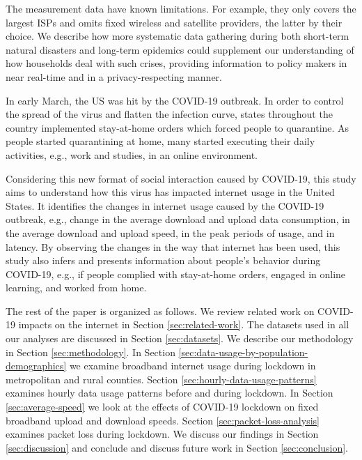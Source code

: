 \documentclass[conference,10pt]{IEEEtran}
\begin{document}
The measurement data have known limitations. For example, they only covers the largest ISPs and omits fixed wireless and satellite providers, the latter by their choice. We describe how more systematic data gathering during both short-term natural disasters and long-term epidemics could supplement our understanding of how households deal with such crises, providing information to policy makers in near real-time and in a privacy-respecting manner.


In early March, the US was hit by the COVID-19 outbreak. In order to control the spread of the virus and flatten the infection curve, states throughout the country implemented stay-at-home orders which forced people to quarantine. As people started quarantining at home, many started executing their daily activities, e.g., work and studies, in an online environment.

Considering this new format of social interaction caused by COVID-19, this study aims to understand how this virus has impacted internet usage in the United States. It identifies the changes in internet usage caused by the COVID-19 outbreak, e.g., change in the average download and upload data consumption, in the average download and upload speed, in the peak periods of usage, and in latency. By observing the changes in the way that internet has been used, this study also infers and presents information about people's behavior during COVID-19, e.g., if people complied with stay-at-home orders, engaged in online learning, and worked from home.

The rest of the paper is organized as follows. We review related work on COVID-19 impacts on the internet in Section \ref{sec:related-work}. The datasets used in all our analyses are discussed in Section \ref{sec:datasets}. We describe our methodology in Section \ref{sec:methodology}. In Section \ref{sec:data-usage-by-population-demographics} we examine broadband internet usage during lockdown in metropolitan and rural counties. Section \ref{sec:hourly-data-usage-patterns} examines hourly data usage patterns before and during lockdown. In Section \ref{sec:average-speed} we look at the effects of COVID-19 lockdown on fixed broadband upload and download speeds. Section \ref{sec:packet-loss-analysis} examines packet loss during lockdown. We discuss our findings in Section \ref{sec:discussion} and conclude and discuss future work in Section \ref{sec:conclusion}.
\end{document}
